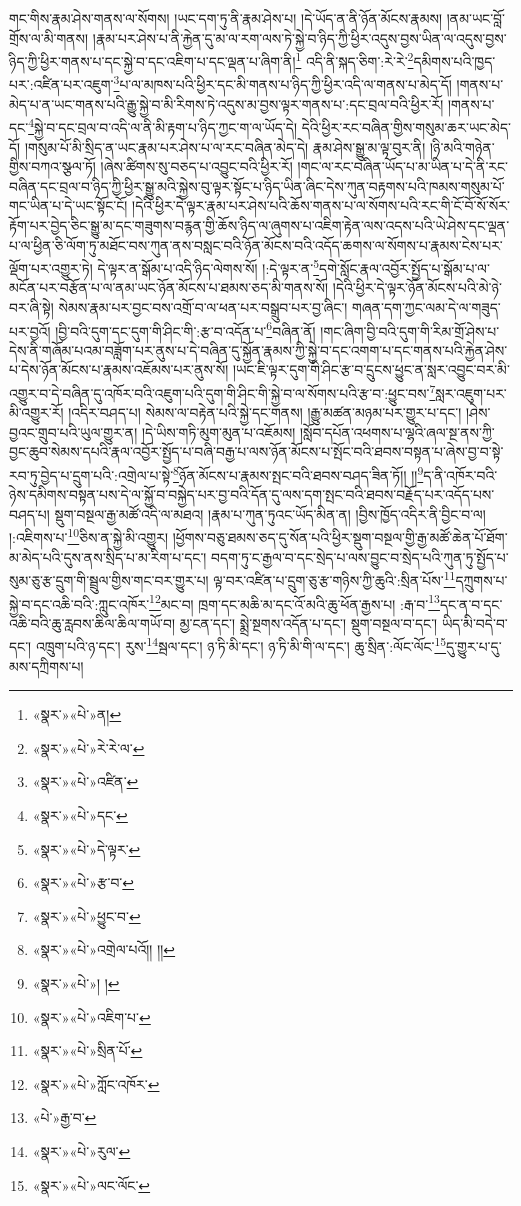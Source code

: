 གང་གིས་རྣམ་ཤེས་གནས་ལ་སོགས། །ཡང་དག་ཏུ་ནི་རྣམ་ཤེས་པ། །དེ་ཡོད་ན་ནི་ཉོན་མོངས་རྣམས། །ནམ་ཡང་བློ་གྲོས་ལ་མི་གནས། །རྣམ་པར་ཤེས་པ་ནི་རྐྱེན་དུ་མ་ལ་རག་ལས་ཏེ་སྐྱེ་བ་ཉིད་ཀྱི་ཕྱིར་འདུས་བྱས་ཡིན་ལ་འདུས་བྱས་ཉིད་ཀྱི་ཕྱིར་གནས་པ་དང་སྐྱེ་བ་དང་འཇིག་པ་དང་ལྡན་པ་ཞིག་ནི།\footnote{«སྣར་»«པེ་»ན།} འདི་ནི་སྐད་ཅིག་:རེ་རེ་\footnote{«སྣར་»«པེ་»རེ་རེ་ལ་}དམིགས་པའི་ཁྱད་པར་:འཛིན་པར་འཇུག་\footnote{«སྣར་»«པེ་»འཛིན་}པ་ལ་མཁས་པའི་ཕྱིར་དང་མི་གནས་པ་ཉིད་ཀྱི་ཕྱིར་འདི་ལ་གནས་པ་མེད་དོ། །གནས་པ་མེད་པ་ན་ཡང་གནས་པའི་རྒྱུ་སྐྱེ་བ་མི་རིགས་ཏེ་འདུས་མ་བྱས་ལྟར་གནས་པ་:དང་བྲལ་བའི་ཕྱིར་རོ། །གནས་པ་དང་\footnote{«སྣར་»«པེ་»དང་}སྐྱེ་བ་དང་བྲལ་བ་འདི་ལ་ནི་མི་རྟག་པ་ཉིད་ཀྱང་ག་ལ་ཡོད་དེ། དེའི་ཕྱིར་རང་བཞིན་གྱིས་གསུམ་ཆར་ཡང་མེད་དོ། །གསུམ་པོ་མི་སྲིད་ན་ཡང་རྣམ་པར་ཤེས་པ་ལ་རང་བཞིན་མེད་དེ། རྣམ་ཤེས་སྒྱུ་མ་ལྟ་བུར་ནི། །ཉི་མའི་གཉེན་གྱིས་བཀའ་སྩལ་ཏོ། །ཞེས་ཚིགས་སུ་བཅད་པ་འབྱུང་བའི་ཕྱིར་རོ། །གང་ལ་རང་བཞིན་ཡོད་པ་མ་ཡིན་པ་དེ་ནི་རང་བཞིན་དང་བྲལ་བ་ཉིད་ཀྱི་ཕྱིར་སྒྱུ་མའི་སྐྱེས་བུ་ལྟར་སྟོང་པ་ཉིད་ཡིན་ཞིང་དེས་ཀུན་བརྟགས་པའི་ཁམས་གསུམ་པོ་གང་ཡིན་པ་དེ་ཡང་སྟོང་ངོ། །དེའི་ཕྱིར་དེ་ལྟར་རྣམ་པར་ཤེས་པའི་ཆོས་གནས་པ་ལ་སོགས་པའི་རང་གི་ངོ་བོ་སོ་སོར་རྟོག་པར་བྱེད་ཅིང་སྒྱུ་མ་དང་གཟུགས་བརྙན་གྱི་ཆོས་ཉིད་ལ་ཞུགས་པ་འཇིག་རྟེན་ལས་འདས་པའི་ཡེ་ཤེས་དང་ལྡན་པ་ལ་ཕྱིན་ཅི་ལོག་ཏུ་མཐོང་བས་ཀུན་ནས་བསླང་བའི་ཉོན་མོངས་བའི་འདོད་ཆགས་ལ་སོགས་པ་རྣམས་ངེས་པར་ལྡོག་པར་འགྱུར་ཏེ། དེ་ལྟར་ན་སྒོམ་པ་འདི་ཉིད་ལེགས་སོ། །:དེ་ལྟར་ན་\footnote{«སྣར་»«པེ་»དེ་ལྟར་}དགེ་སློང་རྣལ་འབྱོར་སྤྱོད་པ་སྒོམ་པ་ལ་མངོན་པར་བརྩོན་པ་ལ་ནམ་ཡང་ཉོན་མོངས་པ་ཐམས་ཅད་མི་གནས་སོ། །དེའི་ཕྱིར་དེ་ལྟར་ཉོན་མོངས་པའི་མེ་ཉེ་བར་ཞི་སྟེ། སེམས་རྣམ་པར་བྱང་བས་འགྲོ་བ་ལ་ཕན་པར་བསྒྲུབ་པར་བྱ་ཞིང་། གཞན་དག་ཀྱང་ལམ་དེ་ལ་གཟུད་པར་བྱའོ། །བྱི་བའི་དུག་དང་དུག་གི་ཤིང་གི་:རྩ་བ་འདོན་པ་\footnote{«སྣར་»«པེ་»རྩ་བ་}བཞིན་ནོ། །གང་ཞིག་བྱི་བའི་དུག་གི་རིམ་གྲོ་ཤེས་པ་དེས་ནི་གཞོམ་པའམ་བཟློག་པར་ནུས་པ་དེ་བཞིན་དུ་སྐྱོན་རྣམས་ཀྱི་སྐྱེ་བ་དང་འགག་པ་དང་གནས་པའི་རྐྱེན་ཤེས་པ་དེས་ཉོན་མོངས་པ་རྣམས་འཇོམས་པར་ནུས་སོ། །ཡང་ཇི་ལྟར་དུག་གི་ཤིང་རྩ་བ་དྲུངས་ཕྱུང་ན་སླར་འབྱུང་བར་མི་འགྱུར་བ་དེ་བཞིན་དུ་འཁོར་བའི་འཇུག་པའི་དུག་གི་ཤིང་གི་སྐྱེ་བ་ལ་སོགས་པའི་རྩ་བ་:ཕྱུང་བས་\footnote{«སྣར་»«པེ་»ཕྱུང་བ་}སླར་འཇུག་པར་མི་འགྱུར་རོ། །འདིར་བཤད་པ། སེམས་ལ་བརྟེན་པའི་སྐྱེ་དང་གནས། །རྒྱུ་མཚན་མཉམ་པར་གྱུར་པ་དང་། །ཤེས་བྱའང་གྲུབ་པའི་ཡུལ་གྱུར་ན། །དེ་ཡིས་གཏི་མུག་མུན་པ་འཇོམས། །སློབ་དཔོན་འཕགས་པ་ལྷའི་ཞལ་སྔ་ནས་ཀྱི་བྱང་ཆུབ་སེམས་དཔའི་རྣལ་འབྱོར་སྤྱོད་པ་བཞི་བརྒྱ་པ་ལས་ཉོན་མོངས་པ་སྤོང་བའི་ཐབས་བསྟན་པ་ཞེས་བྱ་བ་སྟེ་རབ་ཏུ་བྱེད་པ་དྲུག་པའི་:འགྲེལ་པ་སྟེ་\footnote{«སྣར་»«པེ་»འགྲེལ་པའོ།། །།}ཉོན་མོངས་པ་རྣམས་སྤང་བའི་ཐབས་བཤད་ཟིན་ཏོ།། །།\footnote{«སྣར་»«པེ་»། །}ད་ནི་འཁོར་བའི་ཉེས་དམིགས་བསྟན་པས་དེ་ལ་སྐྱོ་བ་བསྐྱེད་པར་བྱ་བའི་དོན་དུ་ལས་དག་སྤང་བའི་ཐབས་བརྗོད་པར་འདོད་པས་བཤད་པ། སྡུག་བསྔལ་རྒྱ་མཚོ་འདི་ལ་མཐའ། །རྣམ་པ་ཀུན་ཏུའང་ཡོད་མིན་ན། །བྱིས་ཁྱོད་འདིར་ནི་བྱིང་བ་ལ། །:འཇིགས་པ་\footnote{«སྣར་»«པེ་»འཇིག་པ་}ཅིས་ན་སྐྱེ་མི་འགྱུར། །ཕྱོགས་བཅུ་ཐམས་ཅད་དུ་སོན་པའི་ཕྱིར་སྡུག་བསྔལ་གྱི་རྒྱ་མཚོ་ཆེན་པོ་ཐོག་མ་མེད་པའི་དུས་ནས་སྲིད་པ་མ་རིག་པ་དང་། བདག་ཏུ་ང་རྒྱལ་བ་དང་སྲེད་པ་ལས་བྱུང་བ་སྲེད་པའི་ཀུན་ཏུ་སྤྱོད་པ་སུམ་ཅུ་རྩ་དྲུག་གི་སྦྲུལ་གྱིས་གང་བར་གྱུར་པ། ལྟ་བར་འཛིན་པ་དྲུག་ཅུ་རྩ་གཉིས་ཀྱི་ཆུའི་:སྲིན་པོས་\footnote{«སྣར་»«པེ་»སྲིན་པོ་}དཀྲུགས་པ་སྐྱེ་བ་དང་འཆི་བའི་:ཀླུང་འཁོར་\footnote{«སྣར་»«པེ་»ཀློང་འཁོར་}མང་བ། ཁྲག་དང་མཆི་མ་དང་འོ་མའི་ཆུ་ཕོན་རྒྱས་པ། :རྒ་བ་\footnote{«པེ་»རྒྱ་བ་}དང་ན་བ་དང་འཆི་བའི་ཆུ་རླབས་ཆིལ་ཆིལ་གཡོ་བ། མྱ་ངན་དང་། སྨྲེ་སྔགས་འདོན་པ་དང་། སྡུག་བསྔལ་བ་དང་། ཡིད་མི་བདེ་བ་དང་། འཁྲུག་པའི་ཉ་དང་། རུས་\footnote{«སྣར་»«པེ་»རུལ་}སྦལ་དང་། ཉ་ཏི་མི་དང་། ཉ་ཏི་མི་གི་ལ་དང་། ཆུ་སྲིན་:ལོང་ལོང་\footnote{«སྣར་»«པེ་»ལང་ལོང་}དུ་གྱུར་པ་དུ་མས་དཀྲིགས་པ། 